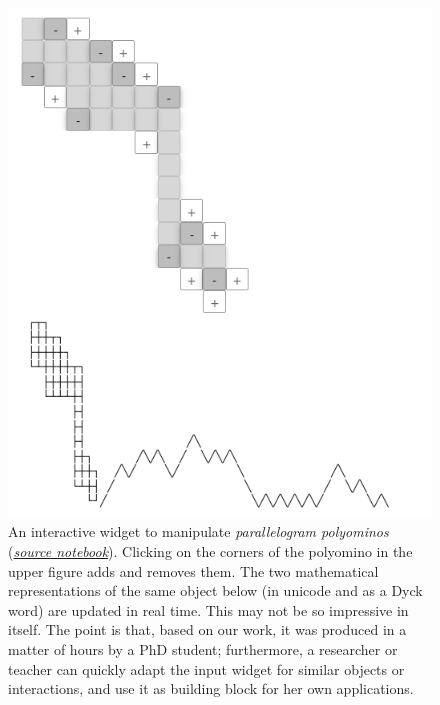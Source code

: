 \documentclass{deliverablereport}
\begin{document}
\begin{figure}[ht]
  \centerline{\includegraphics[width=.8\textwidth]{nheir_parallelogram_polyomino.png}}
  \caption{An interactive widget to manipulate \emph{parallelogram
      polyominos}
    (\href{https://github.com/nheir/sage-combinat-widgets/blob/example_parapolyomino/examples/ParalleloPolyomino.ipynb}{\emph{source
        notebook}}).
    Clicking on the corners of the polyomino in the upper figure adds and removes them.
    The two mathematical representations of the same object below (in
    unicode and as a Dyck word) are updated in real time.
    This may not be so impressive in itself. The point is that, based
    on our work, it was produced in a matter of hours by a PhD
    student; furthermore, a researcher or teacher can quickly adapt
    the input widget for similar objects or interactions, and use it
    as building block for her own applications.}
  \label{fig.combinat_widget}
\end{figure}



\end{document}
